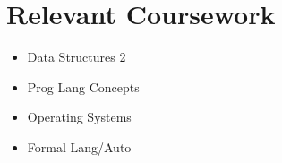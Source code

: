 \documentclass[letterpaper,11pt]{article}
\newcommand{\resumeSubHeadingListStart}{\begin{itemize}[leftmargin=0.0in, label={}]}
\newcommand{\resumeSubHeadingListEnd}{\end{itemize}}
\begin{document}


  \vspace{-5pt}
  \section{Relevant Coursework}
        \begin{multicols}{4}
            \begin{itemize}[itemsep=-5pt, parsep=3pt]
                \item Data Structures 2
                \item Prog Lang Concepts
                \item Operating Systems
                \item Formal Lang/Auto
            \end{itemize}
        \end{multicols}
        \vspace*{2.0\multicolsep}
\end{document}
